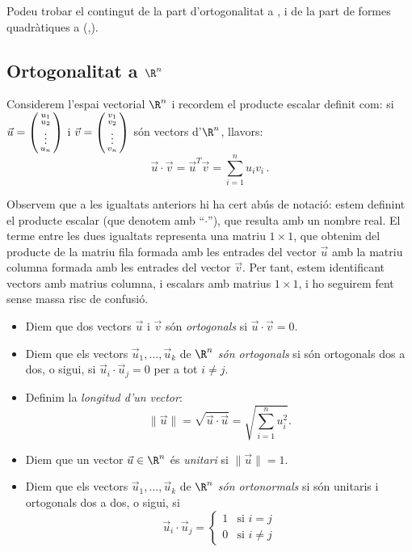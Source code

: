 

Podeu trobar el contingut de la part d'ortogonalitat a \cite[Tema 5]{Bret}, i de la part de formes quadràtiques a (\cite[Tema~8]{Bret},\cite[Tema~4]{NaXa}).
\subsection{Ortogonalitat a \texorpdfstring{$\R^n$}{Rn}}
Considerem l'espai vectorial $\R^n$ i recordem el producte escalar definit com: si $\vec u=\left(\begin{smallmatrix}u_1\\u_2\\ \vdots\\u_n\end{smallmatrix}\right)$ i $\vec v=\left(\begin{smallmatrix}v_1\\v_2\\ \vdots \\ v_n\end{smallmatrix}\right)$ són vectors d'$\R^n$, llavors:
\[
\vec u \cdot \vec v = \vec u^T \vec v=\sum_{i=1}^n u_iv_i \,.
\]
\begin{observacio}
Observem que a les igualtats anteriors hi ha cert abús de notació: estem definint el producte escalar (que denotem amb ``$\cdot$''), que resulta amb un nombre real. El terme entre les dues igualtats representa una matriu $1\times 1$, que obtenim del producte de la matriu fila formada amb les entrades del vector $\vec u$ amb la matriu columna formada amb les entrades del vector $\vec v$. Per tant, estem identificant vectors amb matrius columna, i escalars amb matrius $1\times 1$, i ho seguirem fent sense massa risc de confusió.
\end{observacio}
\begin{definicio}
\begin{itemize}
    \item Diem que dos vectors $\vec u$ i $\vec v$ són \emph{ortogonals} si $\vec u\cdot\vec v=0$.
    \item Diem que els vectors $\vec u_1, \dots, \vec u_k$ de $\R^n$ \emph{són ortogonals} si són ortogonals dos a dos, o sigui, si $\vec u_i\cdot\vec u_j=0$ per a tot $i\neq j$.
    \item Definim la \emph{longitud d'un vector}:
    \[
    \|\vec u\|=\sqrt{\vec u\cdot \vec u}=\sqrt{\sum_{i=1}^n u_i^2}.
    \]
    \item Diem que un vector $\vec u\in\R^n$ és \emph{unitari} si $\|\vec u\|=1$.
    \item Diem que els vectors $\vec u_1, \dots, \vec u_k$ de $\R^n$ \emph{són ortonormals} si són unitaris i ortogonals dos a dos, o sigui, si 
    $$\vec u_i\cdot\vec u_j=\left\{ \begin{array}{ll} 1 & \text{si $i=j$} \\ 0 & \text{si $i\neq j$}\end{array}\right.$$
\end{itemize}
\end{definicio}
